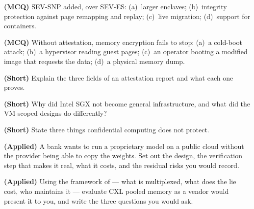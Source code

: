 \begin{reviewq}
  \item \textbf{(MCQ)} SEV-SNP added, over SEV-ES: (a)~larger enclaves;
        (b)~integrity protection against page remapping and replay;
        (c)~live migration; (d)~support for containers.
  \item \textbf{(MCQ)} Without attestation, memory encryption fails to stop:
        (a)~a cold-boot attack; (b)~a hypervisor reading guest pages; (c)~an
        operator booting a modified image that requests the data; (d)~a
        physical memory dump.
  \item \textbf{(Short)} Explain the three fields of an attestation report and
        what each one proves.
  \item \textbf{(Short)} Why did Intel SGX not become general infrastructure,
        and what did the VM-scoped designs do differently?
  \item \textbf{(Short)} State three things confidential computing does not
        protect.
  \item \textbf{(Applied)} A bank wants to run a proprietary model on a public
        cloud without the provider being able to copy the weights. Set out the
        design, the verification step that makes it real, what it costs, and
        the residual risks you would record.
  \item \textbf{(Applied)} Using the framework of  --- what is
        multiplexed, what does the lie cost, who maintains it --- evaluate CXL
        pooled memory as a vendor would present it to you, and write the three
        questions you would ask.
\end{reviewq}
